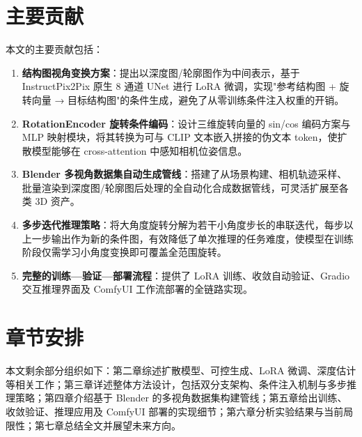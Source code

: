 \section{主要贡献}

本文的主要贡献包括：

\begin{enumerate}[label=(\arabic*)]
    \item \textbf{结构图视角变换方案}：提出以深度图/轮廓图作为中间表示，基于 InstructPix2Pix 原生 8 通道 UNet 进行 LoRA 微调，实现"参考结构图 + 旋转向量 → 目标结构图"的条件生成，避免了从零训练条件注入权重的开销。
    \item \textbf{RotationEncoder 旋转条件编码}：设计三维旋转向量的 sin/cos 编码方案与 MLP 映射模块，将其转换为可与 CLIP 文本嵌入拼接的伪文本 token，使扩散模型能够在 cross-attention 中感知相机位姿信息。
    \item \textbf{Blender 多视角数据集自动生成管线}：搭建了从场景构建、相机轨迹采样、批量渲染到深度图/轮廓图后处理的全自动化合成数据管线，可灵活扩展至各类 3D 资产。
    \item \textbf{多步迭代推理策略}：将大角度旋转分解为若干小角度步长的串联迭代，每步以上一步输出作为新的条件图，有效降低了单次推理的任务难度，使模型在训练阶段仅需学习小角度变换即可覆盖全范围旋转。
    \item \textbf{完整的训练—验证—部署流程}：提供了 LoRA 训练、收敛自动验证、Gradio 交互推理界面及 ComfyUI 工作流部署的全链路实现。
\end{enumerate}

\section{章节安排}

本文剩余部分组织如下：第二章综述扩散模型、可控生成、LoRA 微调、深度估计等相关工作；第三章详述整体方法设计，包括双分支架构、条件注入机制与多步推理策略；第四章介绍基于 Blender 的多视角数据集构建管线；第五章给出训练、收敛验证、推理应用及 ComfyUI 部署的实现细节；第六章分析实验结果与当前局限性；第七章总结全文并展望未来方向。
